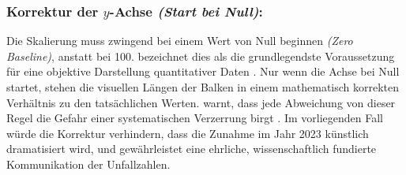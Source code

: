 \subsubsection{Korrektur der \(y\)-Achse \textit{(Start bei Null)}:}
Die Skalierung muss zwingend bei einem Wert von Null beginnen \textit{(Zero Baseline)}, anstatt bei 100. \citeauthor{1} bezeichnet dies als die grundlegendste Voraussetzung für eine objektive Darstellung quantitativer Daten \cite[50]{1}. Nur wenn die Achse bei Null startet, stehen die visuellen Längen der Balken in einem mathematisch korrekten Verhältnis zu den tatsächlichen Werten. \citeauthor{2} warnt, dass jede Abweichung von dieser Regel die Gefahr einer systematischen Verzerrung birgt \cite[55]{2}. Im vorliegenden Fall würde die Korrektur verhindern, dass die Zunahme im Jahr 2023 künstlich dramatisiert wird, und gewährleistet eine ehrliche, wissenschaftlich fundierte Kommunikation der Unfallzahlen.


